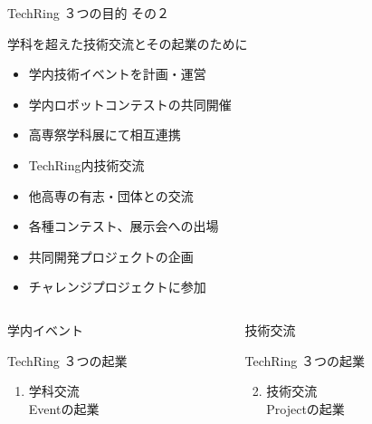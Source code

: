 \documentclass[dvipdfmx]{beamer}
\begin{document}
\begin{frame}{TechRing ３つの目的 その２}
  \begin{greyblock}{学科を超えた技術交流とその起業のために}
    \vspace{1mm}
    \begin{footnotesize}
      \begin{itemize}
        \item 学内技術イベントを計画・運営
        \item 学内ロボットコンテストの共同開催
        \item 高専祭学科展にて相互連携
        \item \alert{TechRing内技術交流}
        \item \alert{他高専の有志・団体との交流}
        \item \alert{各種コンテスト、展示会への出場}
        \item 共同開発プロジェクトの企画
        \item チャレンジプロジェクトに参加
      \end{itemize}
    \end{footnotesize}
  \end{greyblock}

  \begin{columns}
    \begin{column}{0.30\textwidth}
      \begin{block}{学内イベント}
        \begin{footnotesize}
          TechRing ３つの起業
          \begin{enumerate}
            \item 学科交流\\Eventの起業
          \end{enumerate}
        \end{footnotesize}
      \end{block}
    \end{column}

    \begin{column}{0.30\textwidth}
      \begin{alertblock}{技術交流}
        \begin{footnotesize}
          TechRing ３つの起業
          \begin{enumerate}
            \setcounter{enumi}{1}
            \item 技術交流\\Projectの起業
          \end{enumerate}
        \end{footnotesize}
      \end{alertblock}
    \end{column}


\end{columns}
\end{frame}
\end{document}
